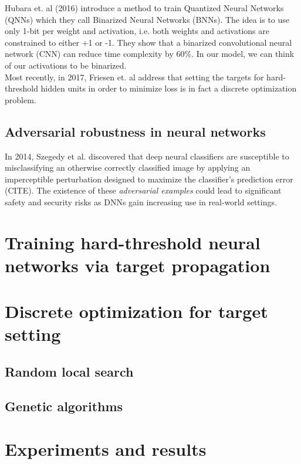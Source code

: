 \documentclass[a4paper]{article}
\begin{document}
Hubara et. al (2016) introduce a method to train Quantized Neural Networks (QNNs) which they call Binarized Neural Networks (BNNs). The idea is to use only 1-bit per weight and activation, i.e. both weights and activations are constrained to either +1 or -1. They show that a binarized convolutional neural network (CNN) can reduce time complexity by 60\%. In our model, we can think of our activations to be binarized.\\ 

Most recently, in 2017, Friesen et. al address that setting the targets for hard-threshold hidden units in order to minimize loss is in fact a discrete optimization problem. 

\subsection{Adversarial robustness in neural networks}

In 2014, Szegedy et al. discovered that deep neural classifiers are susceptible to misclassifying an otherwise correctly classified image by applying an imperceptible perturbation designed to maximize the classifier's prediction error (CITE). The existence of these \textit{adversarial examples} could lead to significant safety and security risks as DNNs gain increasing use in real-world settings. 


\section{Training hard-threshold neural networks via target propagation}
\label{S:3}




\section{Discrete optimization for target setting}
\label{S:4}


\subsection{Random local search}


\subsection{Genetic algorithms}




\section{Experiments and results}
\label{S:5}
\end{document}
